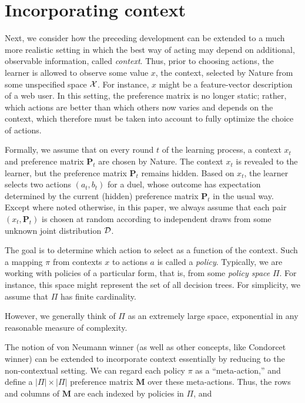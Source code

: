 \section{Incorporating context}
\label{sec:context}

Next, we consider how the preceding development can be extended to a much more realistic setting in which the best way of acting may depend on additional, observable information, called {\em context}. Thus, prior to choosing actions, the learner is allowed to observe some value $x$, the {context}, selected by Nature from some unspecified space ${\cal X}$. For instance, $x$ might be a feature-vector description of a web user. In this setting, the preference matrix is no longer static; rather, which actions are better than which others now varies and depends on the context, which therefore must be taken into account to fully optimize the choice of actions.

Formally, we assume that on every round $t$ of the learning process, a context $x_t$ and preference matrix $\mathbf{P}_t$ are chosen by Nature. The context $x_t$ is revealed to the learner, but the preference matrix $\mathbf{P}_t$ remains hidden. Based on $x_t$, the learner selects two actions $(a_t,b_t)$ for a duel, whose outcome has expectation determined by the current (hidden) preference matrix $\mathbf{P}_t$ in the usual way. Except where noted otherwise, in this paper, we always assume that each pair $(x_t,\mathbf{P}_t)$ is chosen at random according to independent draws from some unknown joint distribution ${\cal D}$.

The goal is to determine which action to select as a function of the context. Such a mapping $\pi$ from contexts $x$ to actions $a$ is called a
{\em policy}. Typically, we are working with policies of a particular form, that is, from some {\em policy space} $\Pi$.
For instance, this space might represent the set of all decision trees. For simplicity, we assume that $\Pi$ has finite cardinality.

However, we generally think of $\Pi$ as an extremely large space, exponential in any reasonable measure of complexity.

The notion of von Neumann winner (as well as other concepts, like Condorcet winner) can be extended to incorporate context essentially by reducing to the non-contextual setting. We can regard each policy $\pi$ as a ``meta-action,'' and define a ${|\Pi|}\times{|\Pi|}$ preference matrix
$\mathbf{M}$ over these meta-actions. Thus, the rows and columns of $\mathbf{M}$ are each indexed by policies in $\Pi$,
and

